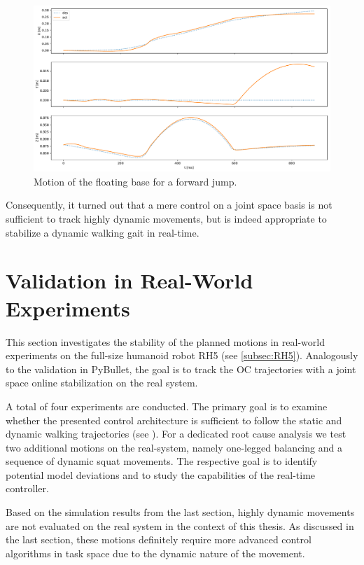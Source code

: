 \begin{figure}[h!]
\centering	
\includegraphics[width=1\textwidth]{fig/jumpForward/pybullet/pybulletBase}
\caption[Motion of the floating base for a forward jump]{Motion of the floating base for a forward jump.}
\label{fig:jumpForward_pybulletBase}
\end{figure}

Consequently, it turned out that a mere control on a joint space basis is not sufficient to track highly dynamic movements, but is indeed appropriate to stabilize a dynamic walking gait in real-time. 


\section{Validation in Real-World Experiments}\label{sec:OnlineExperiments}
This section investigates the stability of the planned motions in real-world experiments on the full-size humanoid robot RH5 (see \cref{subsec:RH5}). Analogously to the validation in PyBullet, the goal is to track the \gls{OC} trajectories with a joint space online stabilization on the real system. 

A total of four experiments are conducted. The primary goal is to examine whether the presented control architecture is sufficient to follow the static and dynamic walking trajectories (see ). For a dedicated root cause analysis we test two additional motions on the real-system, namely one-legged balancing and a sequence of dynamic squat movements. The respective goal is to identify potential model deviations and to study the capabilities of the real-time controller.

Based on the simulation results from the last section, highly dynamic movements are not evaluated on the real system in the context of this thesis. As discussed in the last section, these motions definitely require more advanced control algorithms in task space due to the dynamic nature of the movement. 

